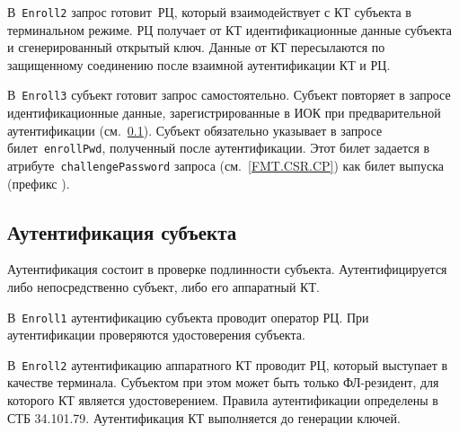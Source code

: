 
В~\texttt{Enroll2} запрос готовит~РЦ, который взаимодействует с КТ 
субъекта в терминальном режиме. РЦ получает от КТ идентификационные 
данные субъекта и сгенерированный открытый ключ. Данные от КТ пересылаются 
по защищенному соединению после взаимной аутентификации КТ и РЦ. 
%



В~\texttt{Enroll3} субъект готовит запрос самостоятельно.
Субъект повторяет в запросе идентификационные данные, 
зарегистрированные в ИОК при предварительной аутентификации
(см.~\ref{PROCESSES.Enroll.Auth}).
%
Субъект обязательно указывает в запросе билет~\texttt{enrollPwd}, 
полученный после аутентификации. Этот билет задается в 
атрибуте~\texttt{challengePassword} запроса 
(см.~\ref{FMT.CSR.CP}) как билет выпуска (префикс ).

\subsection{Аутентификация субъекта}\label{PROCESSES.Enroll.Auth}

Аутентификация состоит в проверке подлинности субъекта.
Аутентифицируется либо непосредственно субъект, либо его аппаратный КТ. 

В~\texttt{Enroll1} аутентификацию субъекта проводит оператор РЦ.
При аутентификации проверяются удостоверения субъекта. 


В~\texttt{Enroll2} аутентификацию аппаратного КТ проводит РЦ, который 
выступает в качестве терминала. Субъектом при этом может быть только 
ФЛ-резидент, для которого КТ является удостоверением. Правила аутентификации 
определены в СТБ 34.101.79. Аутентификация КТ выполняется до генерации 
ключей.


